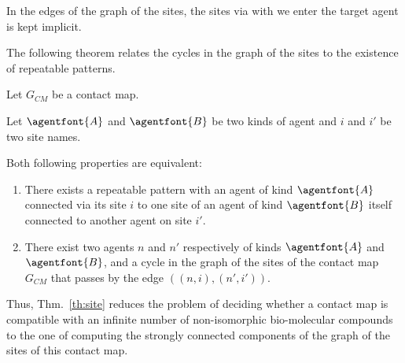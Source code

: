 \documentclass{entcs}
\newcommand{\graphsymb}{G}
\begin{document}
In the edges of the graph of the sites, the sites via with we enter the target agent is kept implicit.

The following theorem relates the cycles in the graph of the sites to the existence of repeatable patterns.

\begin{theorem}
  \label{th:site}
  Let $\graphsymb_{\textit{CM}}$ be a contact map.

Let $\agentfont{A}$ and $\agentfont{B}$ be two kinds of agent and
$i$ and $i'$ be two site names.

  Both following properties are equivalent:
  \begin{enumerate}
    \item There exists a repeatable pattern
    with an agent of kind $\agentfont{A}$ connected via its site $i$
    to one site of an agent of kind $\agentfont{B}$ itself connected to another agent on site $i'$.
\item There exist two agents $n$ and $n'$ respectively of kinds $\agentfont{A}$
and  $\agentfont{B}$, and a  cycle in the graph of the sites of the contact map    $\graphsymb_{\textit{CM}}$  that passes by the edge $((n,i),(n',i'))$.
  \end{enumerate}
\end{theorem}

Thus, Thm.~\ref{th:site} reduces the problem of deciding whether
a contact map is compatible with an infinite number of non-isomorphic bio-molecular compounds to the one of computing the strongly connected components of the graph of the sites of this contact map.
\end{document}
